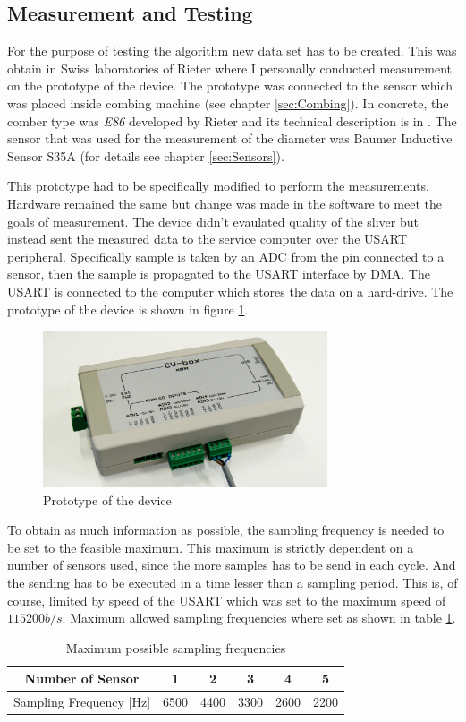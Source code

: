 \documentclass[twoside]{ctuthesis}
\theoremstyle{plain}
\theoremstyle{definition}
\theoremstyle{note}
\begin{document}
\subsection{Measurement and Testing}
\label{sec:MeasurmentAndTesting}
For the purpose of testing the algorithm new data set has to be created. This was obtain in Swiss laboratories of Rieter where I personally conducted measurement on the prototype of the device. The prototype was connected to the sensor which was placed inside combing machine (see chapter \ref{sec:Combing}). In concrete, the comber type was \textit{E86} developed by Rieter and its technical description is in \cite{cite:ComberE86}. The sensor that was used for the measurement of the diameter was Baumer Inductive Sensor S35A (for details see chapter \ref{sec:Sensors}).

This prototype had to be specifically modified to perform the measurements. Hardware remained the same but change was made in the software to meet the goals of measurement. The device didn't evaulated quality of the sliver but instead sent the measured data to the service computer over the USART peripheral. Specifically sample is taken by an ADC from the pin connected to a sensor, then the sample is propagated to the USART interface by DMA. The USART is connected to the computer which stores the data on a hard-drive. The prototype of the device is shown in figure \ref{fig:cvBox_covered}.
\begin{figure}[h]
	\centering
	\includegraphics[width=0.75\textwidth]{cvBox_covered.jpg}
	\caption{Prototype of the device}
	\label{fig:cvBox_covered}
\end{figure}

To obtain as much information as possible, the sampling frequency is needed to be set to the feasible maximum. This maximum is strictly dependent on a number of sensors used, since the more samples has to be send in each cycle. And the sending has to be executed in a time lesser than a sampling period. This is, of course, limited by speed of the USART which was set to the maximum speed of $115200 b/s$. Maximum allowed sampling frequencies where set as shown in table \ref{tab:possibleFs}.
\begin{table}[htbp]
	\centering
	\caption{Maximum possible sampling frequencies}
	\begin{tabular}{cccccc}
		\toprule
		Number of Sensor	 & 1 & 2 & 3 & 4 & 5 \\
		\midrule
		Sampling Frequency [Hz]  & 6500  & 4400   & 3300 & 2600   & 2200  \\
		
		\bottomrule
	\end{tabular}%
	\label{tab:possibleFs}%
\end{table}%
\end{document}
